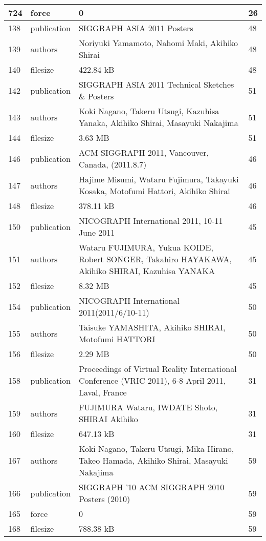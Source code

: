 \begin{longtable}{|l|l|l|l|}
724 & force & 0 & 26 \\ \hline 
138 & publication & SIGGRAPH ASIA 2011 Posters & 48 \\ \hline 
139 & authors & Noriyuki Yamamoto, Nahomi Maki, Akihiko Shirai & 48 \\ \hline 
140 & filesize & 422.84 kB & 48 \\ \hline 
142 & publication & SIGGRAPH ASIA 2011 Technical Sketches \& Posters & 51 \\ \hline 
143 & authors & Koki Nagano, Takeru Utsugi, Kazuhisa Yanaka, Akihiko Shirai, Masayuki Nakajima & 51 \\ \hline 
144 & filesize & 3.63 MB & 51 \\ \hline 
146 & publication & ACM SIGGRAPH 2011, Vancouver, Canada, (2011.8.7) & 46 \\ \hline 
147 & authors & Hajime Misumi, Wataru Fujimura, Takayuki Kosaka, Motofumi Hattori, Akihiko Shirai & 46 \\ \hline 
148 & filesize & 378.11 kB & 46 \\ \hline 
150 & publication & NICOGRAPH International 2011, 10-11 June 2011 & 45 \\ \hline 
151 & authors & Wataru FUJIMURA, Yukua KOIDE, Robert SONGER, Takahiro HAYAKAWA, Akihiko SHIRAI, Kazuhisa YANAKA & 45 \\ \hline 
152 & filesize & 8.32 MB & 45 \\ \hline 
154 & publication & NICOGRAPH International 2011(2011/6/10-11) & 50 \\ \hline 
155 & authors & Taisuke YAMASHITA, Akihiko SHIRAI, Motofumi HATTORI & 50 \\ \hline 
156 & filesize & 2.29 MB & 50 \\ \hline 
158 & publication & Proceedings of Virtual Reality International Conference (VRIC 2011), 6-8 April 2011, Laval, France & 31 \\ \hline 
159 & authors & FUJIMURA Wataru, IWDATE Shoto, SHIRAI Akihiko & 31 \\ \hline 
160 & filesize & 647.13 kB & 31 \\ \hline 
167 & authors & Koki Nagano, Takeru Utsugi, Mika Hirano, Takeo Hamada, Akihiko Shirai, Masayuki Nakajima & 59 \\ \hline 
166 & publication & SIGGRAPH ’10 ACM SIGGRAPH 2010 Posters (2010)  & 59 \\ \hline 
165 & force & 0 & 59 \\ \hline 
168 & filesize & 788.38 kB & 59 \\ \hline 

\end{longtable}
